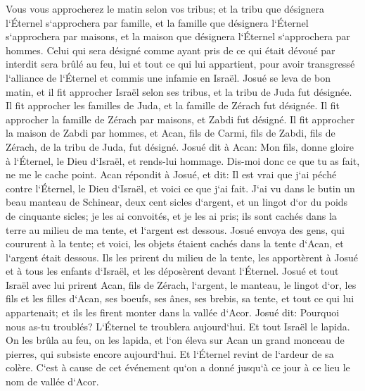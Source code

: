 \verse Vous vous approcherez le matin selon vos tribus; et la tribu que désignera l`Éternel s`approchera par famille, et la famille que désignera l`Éternel s`approchera par maisons, et la maison que désignera l`Éternel s`approchera par hommes. 
\verse Celui qui sera désigné comme ayant pris de ce qui était dévoué par interdit sera brûlé au feu, lui et tout ce qui lui appartient, pour avoir transgressé l`alliance de l`Éternel et commis une infamie en Israël. 
\verse Josué se leva de bon matin, et il fit approcher Israël selon ses tribus, et la tribu de Juda fut désignée. 
\verse Il fit approcher les familles de Juda, et la famille de Zérach fut désignée. Il fit approcher la famille de Zérach par maisons, et Zabdi fut désigné. 
\verse Il fit approcher la maison de Zabdi par hommes, et Acan, fils de Carmi, fils de Zabdi, fils de Zérach, de la tribu de Juda, fut désigné. 
\verse Josué dit à Acan: Mon fils, donne gloire à l`Éternel, le Dieu d`Israël, et rends-lui hommage. Dis-moi donc ce que tu as fait, ne me le cache point. 
\verse Acan répondit à Josué, et dit: Il est vrai que j`ai péché contre l`Éternel, le Dieu d`Israël, et voici ce que j`ai fait. 
\verse J`ai vu dans le butin un beau manteau de Schinear, deux cent sicles d`argent, et un lingot d`or du poids de cinquante sicles; je les ai convoités, et je les ai pris; ils sont cachés dans la terre au milieu de ma tente, et l`argent est dessous. 
\verse Josué envoya des gens, qui coururent à la tente; et voici, les objets étaient cachés dans la tente d`Acan, et l`argent était dessous. 
\verse Ils les prirent du milieu de la tente, les apportèrent à Josué et à tous les enfants d`Israël, et les déposèrent devant l`Éternel. 
\verse Josué et tout Israël avec lui prirent Acan, fils de Zérach, l`argent, le manteau, le lingot d`or, les fils et les filles d`Acan, ses boeufs, ses ânes, ses brebis, sa tente, et tout ce qui lui appartenait; et ils les firent monter dans la vallée d`Acor. 
\verse Josué dit: Pourquoi nous as-tu troublés? L`Éternel te troublera aujourd`hui. Et tout Israël le lapida. On les brûla au feu, on les lapida, 
\verse et l`on éleva sur Acan un grand monceau de pierres, qui subsiste encore aujourd`hui. Et l`Éternel revint de l`ardeur de sa colère. C`est à cause de cet événement qu`on a donné jusqu`à ce jour à ce lieu le nom de vallée d`Acor. 

